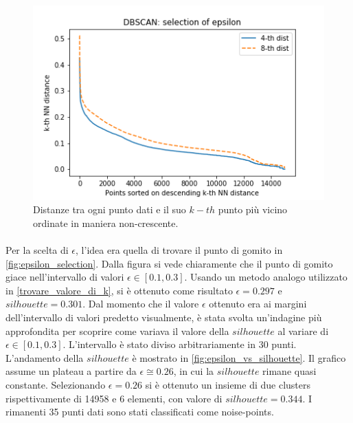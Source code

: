 \documentclass[10pt,a4paper,twocolumn]{article}
\begin{document}
\begin{figure}[hbtp]
\centering
\includegraphics[width=1\columnwidth]{../images/dbscan_epsilon_selection.png}
\caption{Distanze tra ogni punto dati e il suo $k-th$ punto più vicino ordinate in maniera non-crescente.}
\label{fig:epsilon_selection}
\end{figure}

\paragraph{}
Per la scelta di $\epsilon$, l'idea era quella di trovare il punto di gomito in \autoref{fig:epsilon_selection}. Dalla figura si vede chiaramente che il punto di gomito giace nell'intervallo di valori $\epsilon \in \left[0.1, 0.3\right]$. Usando un metodo analogo utilizzato in \autoref{trovare_valore_di_k}, si è ottenuto come risultato $\epsilon=0.297$ e $silhouette=0.301$. Dal momento che il valore $\epsilon$ ottenuto era ai margini dell'intervallo di valori predetto visualmente, è stata svolta un'indagine più approfondita per scoprire come variava il valore della $silhouette$ al variare di $\epsilon \in \left[0.1, 0.3\right]$. L'intervallo è stato diviso arbitrariamente in 30 punti. L'andamento della $silhouette$ è mostrato in \autoref{fig:epsilon_vs_silhouette}. Il grafico assume un plateau a partire da $\epsilon \cong 0.26$, in cui la $silhouette$ rimane quasi constante. Selezionando $\epsilon=0.26$ si è ottenuto un insieme di due clusters rispettivamente di 14958 e 6 elementi, con valore di $silhouette=0.344$. I rimanenti 35 punti dati sono stati classificati come noise-points. 
\end{document}

